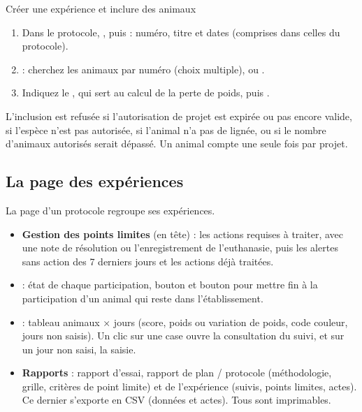 \documentclass[11pt,a4paper]{article}
\begin{document}
\begin{procedure}{Créer une expérience et inclure des animaux}
\begin{enumerate}
  \item Dans le protocole, , puis  : numéro, titre et dates (comprises dans celles du
    protocole).
  \item {} : cherchez les animaux par numéro (choix
    multiple), ou .
  \item Indiquez le , qui sert au calcul de la
    perte de poids, puis .
\end{enumerate}
\end{procedure}
\begin{regle}
L'inclusion est refusée si l'autorisation de projet est expirée ou pas encore
valide, si l'espèce n'est pas autorisée, si l'animal n'a pas de lignée, ou si
le nombre d'animaux autorisés serait dépassé. Un animal compte une seule fois
par projet.
\end{regle}

\subsection{La page des expériences}
La page d'un protocole regroupe ses expériences.
\begin{itemize}
  \item \textbf{Gestion des points limites} (en tête) : les actions requises
    à traiter, avec une note de résolution ou l'enregistrement de
    l'euthanasie, puis les alertes sans action des 7 derniers jours et les
    actions déjà traitées.
  \item {} : état de chaque participation, bouton
     et bouton  pour mettre fin à la
    participation d'un animal qui reste dans l'établissement.
  \item {} : tableau animaux × jours
    (score, poids ou variation de poids, code couleur, jours non saisis). Un
    clic sur une case ouvre la consultation du suivi, et sur un jour non
    saisi, la saisie.
  \item \textbf{Rapports} : rapport d'essai, rapport de plan / protocole
    (méthodologie, grille, critères de point limite) et  de l'expérience (suivis, points limites, actes). Ce dernier
    s'exporte en CSV (données et actes). Tous sont imprimables.
\end{itemize}
\end{document}
